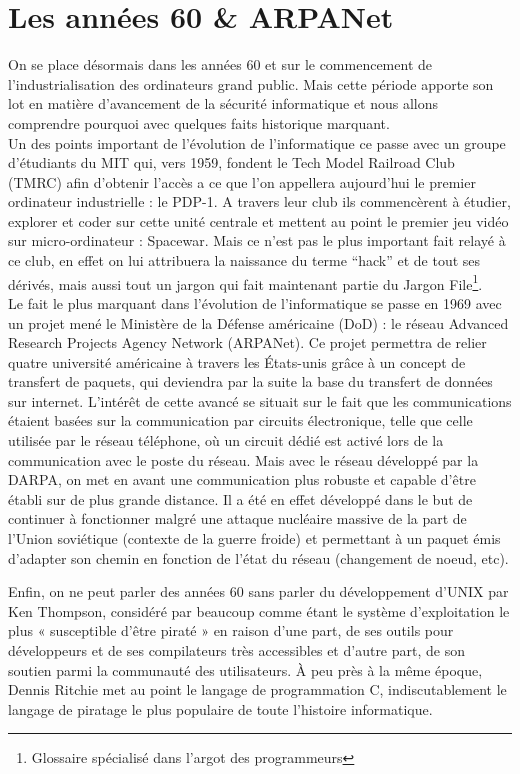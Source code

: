 \documentclass[a4paper]{memoir}
\begin{document}
\section{Les années 60 \& ARPANet}

On se place désormais dans les années 60 et sur le commencement de l'industrialisation des ordinateurs grand public. Mais cette période apporte son lot en matière d'avancement de la sécurité informatique et nous allons comprendre pourquoi avec quelques faits historique marquant.\\

Un des points important de l'évolution de l'informatique ce passe avec un groupe d'étudiants du MIT qui, vers 1959, fondent le Tech Model Railroad Club (TMRC) afin d'obtenir l'accès a ce que l'on appellera aujourd'hui le premier ordinateur industrielle : le PDP-1. A travers leur club ils commencèrent à étudier, explorer et coder sur cette unité centrale et mettent au point le premier jeu vidéo sur micro-ordinateur : Spacewar. Mais ce n'est pas le plus important fait relayé à ce club, en effet on lui attribuera la naissance du terme ``hack'' et de tout ses dérivés, mais aussi tout un jargon qui fait maintenant partie du Jargon File\footnote{Glossaire spécialisé dans l'argot des programmeurs}.\\

Le fait le plus marquant dans l'évolution de l'informatique se passe en 1969 avec un projet mené le Ministère de la Défense américaine (DoD) : le réseau Advanced Research Projects Agency Network (ARPANet). Ce projet permettra de relier quatre université américaine à travers les États-unis grâce à un concept de transfert de paquets, qui deviendra par la suite la base du transfert de données sur internet. L'intérêt de cette avancé se situait sur le fait que les communications étaient basées sur la communication par circuits électronique, telle que celle utilisée par le réseau téléphone, où un circuit dédié est activé lors de la communication avec le poste du réseau. Mais avec le réseau développé par la DARPA, on met en avant une communication plus robuste et capable d'être établi sur de plus grande distance. Il a été en effet développé dans le but de continuer à fonctionner malgré une attaque nucléaire massive de la part de l'Union soviétique (contexte de la guerre froide) et permettant à un paquet émis d'adapter son chemin en fonction de l'état du réseau (changement de noeud, etc).

Enfin, on ne peut parler des années 60 sans parler du développement d'UNIX par Ken Thompson, considéré par beaucoup comme étant le système d'exploitation le plus « susceptible d'être piraté » en raison d'une part, de ses outils pour développeurs et de ses compilateurs très accessibles et d'autre part, de son soutien parmi la communauté des utilisateurs. À peu près à la même époque, Dennis Ritchie met au point le langage de programmation C, indiscutablement le langage de piratage le plus populaire de toute l'histoire informatique.\\
\end{document}
